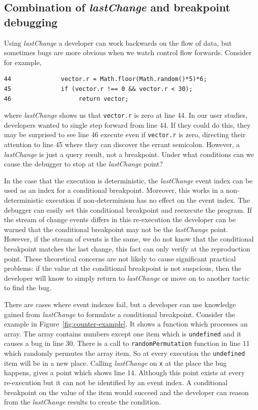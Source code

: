 \documentclass[runningheads,a4paper]{llncs}
\begin{document}
\subsection{Combination of \textit{lastChange} and breakpoint debugging}
\label{sec:pausing}
Using \textit{lastChange} a developer can work backwards on the flow of data, but sometimes bugs are more obvious when
we watch control flow forwards. Consider for example, 
\begin{verbatim}
44              vector.r = Math.floor(Math.random()*5)*6;
45              if (vector.r !== 0 && vector.r < 30);
46                   return vector;
\end{verbatim}
where \textit{lastChange} shows us that \texttt{vector.r} is zero at line 44. In our user studies, developers
wanted to single step forward from line 44. If they could do this, they may be surprised to see line 46 execute 
even if \texttt{vector.r} is zero, directing their attention to line 45 where they can discover the errant semicolon.
However, a \textit{lastChange} is just a query result, not a breakpoint. Under what conditions can we 
cause the debugger to stop at the \textit{lastChange} point?

In the case that the execution is deterministic, the \textit{lastChange}
event index can be used as an index for a conditional breakpoint. 
Moreover, this works in a non-deterministic execution if non-determinism
has no effect on the event index.  The debugger can easily set this conditional breakpoint
and reexecute the program. If the stream of change events differs in this re-execution the
developer can be warned that the conditional breakpoint may not be the \textit{lastChange} point.
However, if the stream of events is the same, we do not know that the 
conditional breakpoint matches the last 
change, this fact  can only verify  at the reproduction point. These theoretical concerns are not
likely to cause significant practical problems: if the value at the conditional breakpoint is not suspcious, 
then the developer will know to simply return to \textit{lastChange} or move on to another tactic to find the bug.

There are cases where event indexes fail, but a developer can use knowledge gained from \textit{lastChange}
to formulate a conditional breakpoint.
Consider the example in Figure~\ref{fig:counter-example}. It shows a function which processes an
array. The array contains numbers except one item which is
\texttt{undefined} and it causes a bug in line 30. There is a call to
\texttt{randomPermutation} function in line 11 which randomly
permutes the array item. So at every execution the
\texttt{undefined} item will be in a new place. Calling
\textit{lastChange} on \texttt{x} at the place the bug happens, gives a
point which shows line 14. Although this point exists at every
re-execution but it can not be identified by an event index. A conditional breakpoint on 
the value of the item would succeed and the developer can reason from the 
\textit{lastChange} results to create the condition. 
\end{document}
